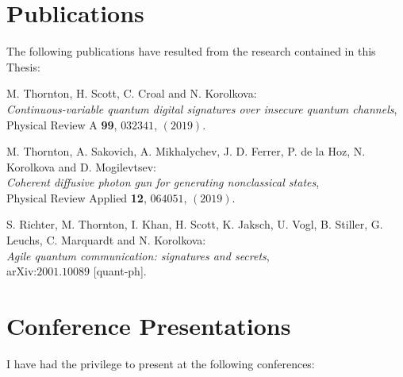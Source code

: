 \chapter*{\hfill Publications}


The following publications have resulted from the research contained in this Thesis:

\vspace{0.5in}
\begin{minipage}{\linewidth}
M. Thornton, H. Scott, C. Croal and N. Korolkova: \\
\emph{Continuous-variable quantum digital signatures over insecure quantum channels}, \\
Physical Review A \textbf{99}, $032341$, $\left(2019\right)$.
\end{minipage}

\vspace{0.25in}
\begin{minipage}{\linewidth}
M. Thornton, A. Sakovich, A. Mikhalychev, J. D. Ferrer, P. de la Hoz, N. Korolkova and D. Mogilevtsev: \\
\emph{Coherent diffusive photon gun for generating nonclassical states}, \\
Physical Review Applied \textbf{12}, $064051$, $\left(2019\right)$.
\end{minipage}

\vspace{0.25in}
\begin{minipage}{\linewidth}
S. Richter, M. Thornton, I. Khan, H. Scott, K. Jaksch, U. Vogl, B. Stiller, G. Leuchs, C. Marquardt and N. Korolkova: \\
\emph{Agile quantum communication: signatures and secrets}, \\
arXiv:$2001.10089$ [quant-ph].
\end{minipage}



\chapter*{\hfill Conference Presentations}
I have had the privilege to present at the following conferences:

